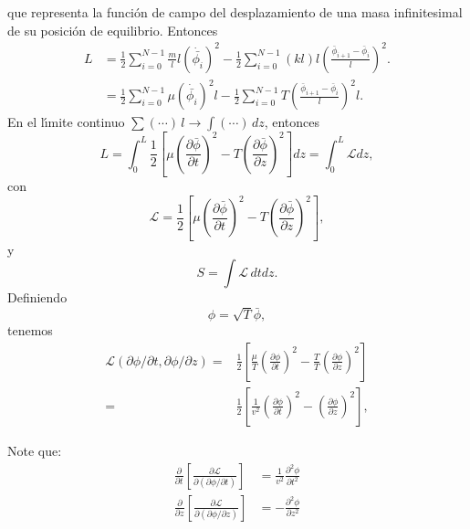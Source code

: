 \begin{frame}
que representa la funci\'on de campo del desplazamiento de una masa
infinitesimal de su posici\'on de equilibrio. Entonces
\begin{align}
L&=\frac{1}{2}\sum_{i=0}^{N-1}\frac{m}{l}l
  \left(
    \dot{\bar{\phi_i}}
  \right)^2-\frac{1}{2}\sum_{i=0}^{N-1}(k l) l
  \left(
\frac{\bar\phi_{i+1}-\bar\phi_{i}}{l}
  \right)^2.\nonumber\\
&=\frac{1}{2}\sum_{i=0}^{N-1}\mu
  \left(
    \dot{\bar{\phi_i}}
  \right)^2l-\frac{1}{2}\sum_{i=0}^{N-1}T
  \left(
\frac{\bar\phi_{i+1}-\bar\phi_{i}}{l}
  \right)^2l.
\label{eq:1strLsumm}
\end{align}
En el l\'\i mite continuo $\sum(\cdots)\,l\to\int(\cdots)\,dz$, entonces 
\begin{equation}
\label{eq:238}
  L=\int_0^L\frac{1}{2}
\left[
  \mu\left(\frac{\partial\bar\phi}{\partial t}\right)^2- T\left(\frac{\partial\bar\phi}{\partial z}\right)^2
\right]dz=\int_0^L\mathcal{L}dz,
\end{equation}
con
\begin{equation}
  \label{eq:call1}
  \mathcal{L}=\frac{1}{2}
\left[
  \mu\left(\frac{\partial\bar\phi}{\partial t}\right)^2- T\left(\frac{\partial\bar\phi}{\partial z}\right)^2
\right],
\end{equation}
y
\begin{equation}
  \label{eq:Scall}
  S=\int\mathcal{L}\,dtdz.
\end{equation}
Definiendo
\begin{equation}
  \label{eq:barff}
  \phi=\sqrt{T}\bar\phi,
\end{equation}
tenemos
\begin{align}
  \label{eq:call2}
  \mathcal{L}(\partial\phi/\partial t,\partial\phi/\partial z)=&
\frac{1}{2}
\left[
  \frac{\mu}{T}\left(\frac{\partial\phi}{\partial t}\right)^2- \frac{T}{T}\left(\frac{\partial\phi}{\partial z}\right)^2
\right]\nonumber\\
=&\frac{1}{2}
\left[
  \frac{1}{v^2}\left(\frac{\partial\phi}{\partial t}\right)^2-\left(\frac{\partial\phi}{\partial z}\right)^2
\right],
\end{align}
\end{frame}
Note que:
\begin{align}
  \label{eq:dcalt}
  \frac{\partial}{\partial t}
  \left[
    \frac{\partial\mathcal{L}}{\partial
      (\partial\phi/\partial t)}
  \right]&=    \frac{1}{v^2}\frac{\partial^2\phi}{\partial t^2}\\
  \label{eq:dcalz} %
  \frac{\partial}{\partial z}
  \left[
    \frac{\partial\mathcal{L}}{\partial
      (\partial\phi/\partial z)}
  \right]&= -\frac{\partial^2\phi}{\partial z^2}
\end{align}


